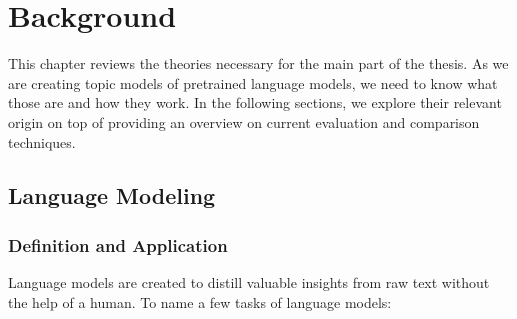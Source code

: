 \chapter{Background}
This chapter reviews the theories necessary for the main part of the thesis. As we are creating topic models of pretrained language models, we need to know what those are and how they work. In the following sections, we explore their relevant origin  on top of providing an overview on current evaluation and comparison techniques.

\section{Language Modeling}
\subsection{Definition and Application}
Language models are created to distill valuable insights from raw text without the help of a human. To name a few tasks of language models:
